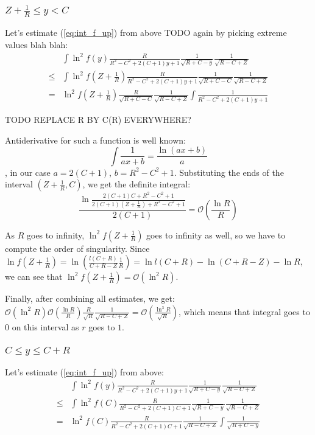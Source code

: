 \documentclass[12pt, a4paper]{article}
\theoremstyle{plain}
\newcommand{\mcO}{\mathcal{O}} %
\begin{document}
\subsubsection{$Z + \frac{1}{R} \le y < C$}
Let's estimate (\ref{eq:int_f_up}) from above TODO again by picking extreme values blah blah:
\begin{align*}
       & \int \ln^2 f(y) \frac{R}{R^2 - C^2 + 2 (C + 1) y + 1} \frac{1}{\sqrt{R + C - y}} \frac{1}{\sqrt{R - C + Z}}
\\ \le & \int \ln^2 f(Z + \frac{1}{R}) \frac{R}{R^2 - C^2 + 2 (C + 1) y + 1} \frac{1}{\sqrt{R + C - C}} \frac{1}{\sqrt{R - C + Z}}
\\  =  & \ln^2 f(Z + \frac{1}{R})  \frac{R}{\sqrt{R + C - C}} \frac{1}{\sqrt{R - C + Z}} \int \frac{1}{R^2 - C^2 + 2 (C + 1) y + 1}
\end{align*}

TODO REPLACE R BY C(R) EVERYWHERE?

Antiderivative for such a function is well known:
\[
\int \frac{1}{a x + b} = \frac{\ln (a x + b)}{a}
\]
, in our case $a = 2 (C + 1)$, $b = R^2 - C^2 + 1$. Substituting the ends of the interval $(Z + \frac{1}{R}, C)$, we get the definite integral:
\[
\frac{\ln \frac{2 (C + 1) C + R^2 - C^2 + 1}{2 (C + 1) (Z + \frac{1}{R}) + R^2 - C^2 + 1}}{2 (C + 1)} = \mcO\left( \frac{\ln R}{R} \right)
\]

As $R$ goes to infinity, $\ln^2 f(Z + \frac{1}{R})$ goes to infinity as well, so we have to compute the order of singularity. Since $\ln f(Z + \frac{1}{R}) = \ln \left( \frac{l(C + R)}{C + R - Z} \frac{1}{R} \right) = \ln l(C + R) - \ln (C + R - Z) - \ln R$, we can see that $\ln^2 f(Z + \frac{1}{R}) = \mcO (\ln^2 R)$.

Finally, after combining all estimates, we get: $\mcO (\ln^2 R) \mcO\left( \frac{\ln R}{R} \right) \frac{R}{\sqrt{R}} \frac{1}{\sqrt{R - C + Z}} = \mcO\left( \frac{\ln^3 R}{\sqrt{R}} \right)$, which means that integral goes to $0$ on this interval as $r$ goes to $1$.

\subsubsection{$C \le y \le C + R$}

Let's estimate (\ref{eq:int_f_up}) from above:
\begin{align*}
       & \int \ln^2 f(y) \frac{R}{R^2 - C^2 + 2 (C + 1) y + 1} \frac{1}{\sqrt{R + C - y}} \frac{1}{\sqrt{R - C + Z}}
\\ \le & \int \ln^2 f(C) \frac{R}{R^2 - C^2 + 2 (C + 1) C + 1} \frac{1}{\sqrt{R + C - y}} \frac{1}{\sqrt{R - C + Z}}
\\ =   & \ln^2 f(C) \frac{R}{R^2 - C^2 + 2 (C + 1) C + 1} \frac{1}{\sqrt{R - C + Z}} \int \frac{1}{\sqrt{R + C - y}}
\end{align*}
\end{document}
